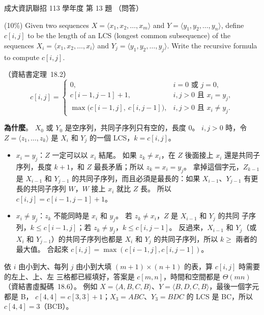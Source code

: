 \begin{pastexam}[label={px:ncku-113-prog-13}]{成大資訊聯招 113 學年度 第 13 題}
（問答）

(10\%) Given two sequences $X=\langle x_1,x_2,\ldots,x_m\rangle$ and $Y=\langle
y_1,y_2,\ldots,y_n\rangle$, define $c[i,j]$ to be the length of an LCS (longest common
subsequence) of the sequences $X_i=\langle x_1,x_2,\ldots,x_i\rangle$ and $Y_j=\langle
y_1,y_2,\ldots,y_j\rangle$. Write the recursive formula to compute $c[i,j]$.
\end{pastexam}

\begin{pastsoln}
（資結書定理~18.2）
\[
c[i, j] = \begin{cases}
0, & i = 0 \text{ 或 } j = 0, \\
c[i - 1, j - 1] + 1, & i, j > 0 \text{ 且 } x_i = y_j, \\
\max\bigl(c[i - 1, j],\ c[i, j - 1]\bigr), & i, j > 0 \text{ 且 } x_i \ne y_j .
\end{cases}
\]

\textbf{為什麼}。 $X_0$ 或 $Y_0$ 是空序列，共同子序列只有空的，長度 $0$。 $i, j > 0$ 時，令
$Z = \langle z_1, \ldots, z_k \rangle$ 是 $X_i$ 和 $Y_j$ 的一個 LCS，$k = c[i, j]$。
\begin{itemize}
\item $x_i = y_j$：$Z$ 一定可以以 $x_i$ 結尾。 如果 $z_k \ne x_i$，在 $Z$ 後面接上 $x_i$ 還是共同子
序列，長度 $k + 1$，和 $Z$ 最長矛盾；所以 $z_k = x_i = y_j$。 拿掉這個字元，$Z_{k-1}$ 是 $X_{i-1}$ 和
$Y_{j-1}$ 的共同子序列，而且必須是最長的：如果 $X_{i-1}$、$Y_{j-1}$ 有更長的共同子序列 $W$，$W$ 接上
$x_i$ 就比 $Z$ 長。 所以 $c[i, j] = c[i - 1, j - 1] + 1$。
\item $x_i \ne y_j$：$z_k$ 不能同時是 $x_i$ 和 $y_j$。 若 $z_k \ne x_i$，$Z$ 是 $X_{i-1}$ 和 $Y_j$ 的共同
子序列，$k \le c[i - 1, j]$；若 $z_k \ne y_j$，$k \le c[i, j - 1]$。 反過來，$X_{i-1}$ 和 $Y_j$（或 $X_i$ 和
$Y_{j-1}$）的共同子序列也都是 $X_i$ 和 $Y_j$ 的共同子序列，所以 $k \ge$ 兩者的最大值。 合起來
$c[i, j] = \max(c[i - 1, j], c[i, j - 1])$。
\end{itemize}

依 $i$ 由小到大、每列 $j$ 由小到大填 $(m + 1) \times (n + 1)$ 的表，算 $c[i, j]$ 時需要的左上、上、左
三格都已經填好，答案是 $c[m, n]$，時間和空間都是 $\Theta(mn)$（資結書虛擬碼~18.6）。 例如
$X = \langle A, B, C, B \rangle$、$Y = \langle B, D, C, B \rangle$，最後一個字元都是 B，
$c[4, 4] = c[3, 3] + 1$；$X_3 = ABC$、$Y_3 = BDC$ 的 LCS 是 BC，所以 $c[4, 4] = 3$（BCB）。
\end{pastsoln}

